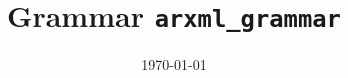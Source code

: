 \documentclass[landscape]{book}
\begin{document}
\title{\Huge{Grammar \texttt{arxml\_grammar}}}
\date \today 

\maketitle


\end{document}
